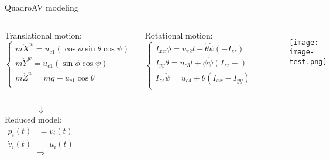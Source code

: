 \documentclass[table,aspectratio=1610]{beamer}%
\begin{document}
\begin{frame}{QuadroAV modeling}
	\begin{columns}
		Translational motion:
		{\footnotesize
			\begin{equation}\label{eq:model:translation}
			\begin{cases}
			m\ddot{X}^w = u_{c1}(\cos\phi \sin\theta \cos\psi) \\
			m\ddot{Y}^w = u_{c1}(\sin\phi \cos\psi ) \\
			m\ddot{Z}^w = mg - u_{c1} \cos\theta \\
			\end{cases}
			\end{equation}
		}
		
		Rotational motion:
		{\footnotesize
			\begin{equation}\label{eq:model:rotation}
			\begin{cases}
			I_{xx}\ddot{\phi} = u_{c2}l+\dot{\theta}\dot{\psi}(-I_{zz}) \\
			I_{yy}\ddot{\theta} = u_{c3}l+\dot{\phi}\dot{\psi}(I_{zz}-) \\
			I_{zz}\ddot{\psi} = u_{c4}+\dot{\theta}(I_{xx}-I_{yy}) \\
			\end{cases}
			\end{equation}
		}
		
		\begin{figure}
			\centering
			\texttt{[image: image-test.png]}
		\end{figure}
	\end{columns}
	
	\pause
	\begin{columns}
		\column[c]{0.55\textwidth}
		{\Large \color{red}
			\begin{equation*}
			\Downarrow
			\end{equation*}
		}
		Reduced model:
		{\footnotesize
			\begin{equation} \label{eq:system:continuous:initial}
			\begin{split}
			\dot{p}_i(t) & = v_i(t) \\
			\dot{v}_i(t) & = u_i(t)
			\end{split}
			\end{equation}
		}
		\pause
		\column[c]{0.1\textwidth}
		{\Large \color{red}
			\[
			\Longrightarrow
			\]
		}
		

\end{columns}
\end{frame}
\end{document}
